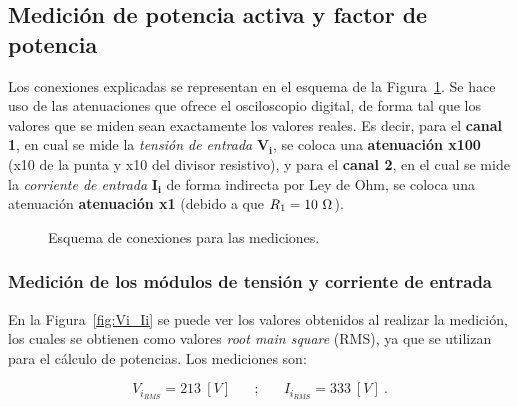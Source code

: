   \subsection{Medición de potencia activa y factor de potencia} 
    Los conexiones explicadas se representan en el esquema de la Figura~\ref{fig:EsquemaConexiones}.
    Se hace uso de las atenuaciones que ofrece el osciloscopio digital, de forma tal que los valores
    que se miden sean exactamente los valores reales. Es decir, para el \textbf{canal 1}, en cual se mide
    la \textit{tensión de entrada} $\mathbf{V_i}$, se coloca una \textbf{atenuación x100} (x10 de la punta
    y x10 del divisor resistivo), y para el \textbf{canal 2}, en el cual se mide la \textit{corriente de entrada}
    $\mathbf{I_i}$ de forma indirecta por Ley de Ohm, se coloca una atenuación \textbf{atenuación x1}
    (debido a que $R\textsubscript{1}=10\ \Omega$).

    \begin{figure}[H]
      \centering
      \caption{Esquema de conexiones para las mediciones.}
      \label{fig:EsquemaConexiones}
    \end{figure}

    \subsubsection{Medición de los módulos de tensión y corriente de entrada}
      En la Figura~\ref{fig:Vi_Ii} se puede ver los valores obtenidos al realizar la medición, los cuales
      se obtienen como valores \textit{root main square} (RMS), ya que se utilizan para el cálculo de 
      potencias. Los mediciones son:
      
      \begin{equation*}
        \boxed{V_{i_{RMS}} =  213 \ [V]} \hspace{20pt} ; \hspace{20pt} \boxed{I_{i_{RMS}} = 333\ [V]}\ .
      \end{equation*}
      
